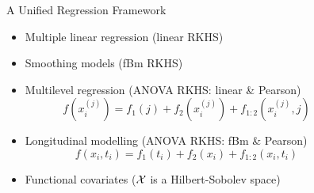 \documentclass{beamer}
\newlength{\onecolwid}
\newlength{\twocolwid}
\newlength{\threecolwid}
\begin{document}
\begin{frame}[t]
\begin{columns}[t]
\begin{column}{\onecolwid}
\begin{block}{A Unified Regression Framework}
\begin{itemize}
  \item Multiple linear regression (linear RKHS)
  \item Smoothing models (fBm RKHS)
  \item Multilevel regression (ANOVA RKHS: linear \& Pearson)
  \vspace{5pt}
  \[
      f(x_i^{(j)}) = f_1(j) + f_2(x_i^{(j)}) + f_{1:2}(x_i^{(j)}, j)
  \]
  \vspace{-35pt}  
  \item Longitudinal modelling (ANOVA RKHS: fBm \& Pearson)
  \vspace{-21pt}
  \[
    f(x_i, t_i) = f_1(t_i) + f_2(x_{i}) + f_{1:2}(x_{i},t_i)
  \]
  \vspace{-33pt}
  \item Functional covariates (${\mathcal X}$ is a Hilbert-Sobolev space)
\end{itemize}

\end{block}

\end{column}  %

\spacercolumn
\begin{column}{\threecolwid}
\vspace{-40pt}  

\begin{columns}[t,totalwidth=\twocolwid]
\begin{column}{\twocolwid}  %


\end{column}
\end{columns}
\end{column}
\end{columns}
\end{frame}
\end{document}
